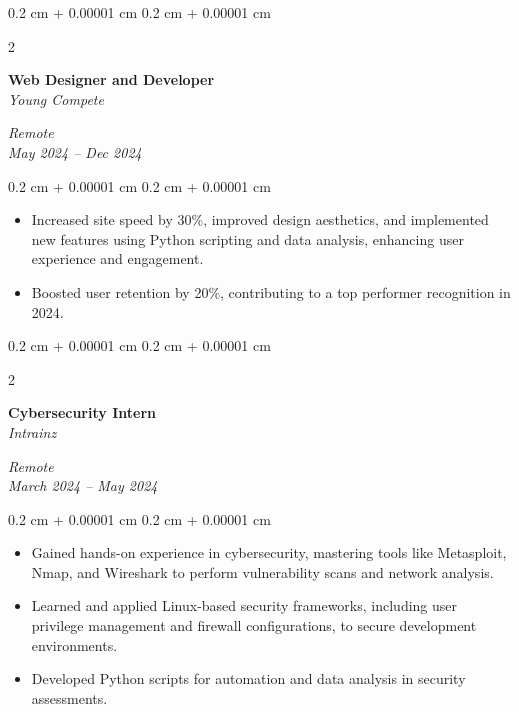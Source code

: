 \documentclass[10pt, letterpaper]{article}
\newenvironment{highlights}{
    \begin{itemize}[
        topsep=0.10 cm,
        parsep=0.10 cm,
        partopsep=0pt,
        itemsep=0pt,
        leftmargin=0.4 cm + 10pt
    ]
}{
    \end{itemize}
} %
\newenvironment{onecolentry}{
    \begin{adjustwidth}{
        0.2 cm + 0.00001 cm
    }{
        0.2 cm + 0.00001 cm
    }
}{
    \end{adjustwidth}
} %
\newenvironment{twocolentry}[2][]{
    \onecolentry
    \def\secondColumn{#2}
    \setcolumnwidth{\fill, 4.5 cm}
    \begin{paracol}{2}
}{
    \switchcolumn \raggedleft \secondColumn
    \end{paracol}
    \endonecolentry
} %
\begin{document}
    \vspace{0.2 cm}
    \begin{twocolentry}{
        \textit{Remote} \\
        \textit{May 2024 – Dec 2024}
    }
        \textbf{Web Designer and Developer} \\
        \textit{Young Compete}
    \end{twocolentry}
    \vspace{0.10 cm}
    \begin{onecolentry}
        \begin{highlights}
            \item Increased site speed by 30\%, improved design aesthetics, and implemented new features using Python scripting and data analysis, enhancing user experience and engagement.
            \item Boosted user retention by 20\%, contributing to a top performer recognition in 2024.
        \end{highlights}
    \end{onecolentry}
    \vspace{0.2 cm}
    \begin{twocolentry}{
        \textit{Remote} \\
        \textit{March 2024 – May 2024}
    }
        \textbf{Cybersecurity Intern} \\
        \textit{Intrainz}
    \end{twocolentry}
    \vspace{0.10 cm}
    \begin{onecolentry}
        \begin{highlights}
            \item Gained hands-on experience in cybersecurity, mastering tools like Metasploit, Nmap, and Wireshark to perform vulnerability scans and network analysis.
            \item Learned and applied Linux-based security frameworks, including user privilege management and firewall configurations, to secure development environments.
            \item Developed Python scripts for automation and data analysis in security assessments.
        \end{highlights}
    \end{onecolentry}
\end{document}
